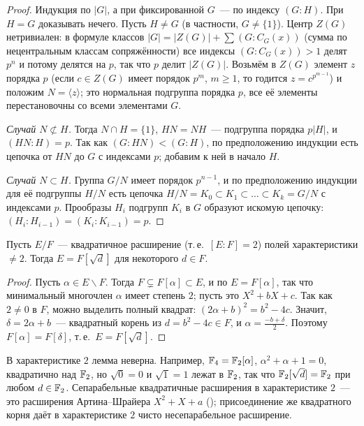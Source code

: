 \begin{proof}
Индукция по $|G|$, а при фиксированной $G$~--- по индексу $(G:H)$. При $H=G$ доказывать нечего. Пусть $H\ne G$ (в
частности, $G\ne\{1\}$). Центр $Z(G)$ нетривиален: в формуле классов $|G|=|Z(G)|+\sum(G:C_G(x))$ (сумма по
нецентральным классам сопряжённости) все индексы $(G:C_G(x))>1$ делят $p^n$ и потому делятся на $p$, так что $p$
делит $|Z(G)|$. Возьмём в $Z(G)$ элемент $z$ порядка $p$ (если $c\in Z(G)$ имеет порядок $p^m$, $m\ge1$, то годится
$z=c^{p^{m-1}}$) и положим $N=\langle z\rangle$; это нормальная подгруппа порядка $p$, все её элементы перестановочны
со всеми элементами $G$.

\emph{Случай $N\not\subset H$.} Тогда $N\cap H=\{1\}$, $HN=NH$~--- подгруппа порядка $p|H|$, и $(HN:H)=p$. Так как
$(G:HN)<(G:H)$, по предположению индукции есть цепочка от $HN$ до $G$ с индексами $p$; добавим к ней в начало $H$.

\emph{Случай $N\subset H$.} Группа $G/N$ имеет порядок $p^{n-1}$, и по предположению индукции для её подгруппы $H/N$
есть цепочка $H/N=K_0\subset K_1\subset\dots\subset K_k=G/N$ с индексами $p$. Прообразы $H_i$ подгрупп $K_i$ в $G$
образуют искомую цепочку: $(H_i:H_{i-1})=(K_i:K_{i-1})=p$.
\end{proof}

\begin{lemma}[3.25]
Пусть $E/F$~--- квадратичное расширение (т.\,е.\ $[E:F]=2$) полей характеристики $\ne2$. Тогда $E=F[\sqrt d]$ для
некоторого $d\in F$.
\end{lemma}

\begin{proof}
Пусть $\alpha\in E\smallsetminus F$. Тогда $F\subsetneq F[\alpha]\subset E$, и по  $E=F[\alpha]$, так что
минимальный многочлен $\alpha$ имеет степень $2$; пусть это $X^2+bX+c$. Так как $2\ne0$ в $F$, можно выделить полный
квадрат: $(2\alpha+b)^2=b^2-4c$. Значит, $\delta=2\alpha+b$~--- квадратный корень из $d=b^2-4c\in F$, и
$\alpha=\frac{-b+\delta}2$. Поэтому $F[\alpha]=F[\delta]$, т.\,е.\ $E=F[\sqrt d]$.
\end{proof}

В характеристике $2$ лемма неверна. Например, $\mathbb F_4=\mathbb F_2[\alpha]$, $\alpha^2+\alpha+1=0$, квадратично над $\mathbb F_2$, но
$\sqrt0=0$ и $\sqrt1=1$ лежат в $\mathbb F_2$, так что $\mathbb F_2[\sqrt d]=\mathbb F_2$ при любом $d\in\mathbb F_2$. Сепарабельные квадратичные
расширения в характеристике $2$~--- это расширения Артина--Шрайера $X^2+X+a$ (); присоединение же
квадратного корня даёт в характеристике $2$ чисто несепарабельное расширение.

